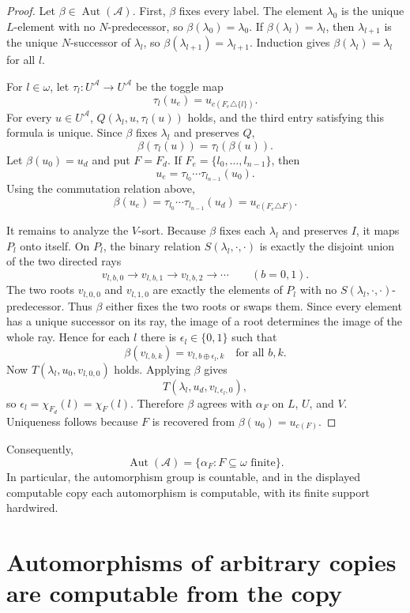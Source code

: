 \documentclass[12pt]{article}
\theoremstyle{definition}
\theoremstyle{remark}
\newcommand{\Aut}{\operatorname{Aut}}
\begin{document}
\begin{proof}
Let \(\beta\in\Aut(\mathcal A)\).  First, \(\beta\) fixes every label.  The element \(\lambda_0\) is the unique \(L\)-element with no \(N\)-predecessor, so \(\beta(\lambda_0)=\lambda_0\).  If \(\beta(\lambda_l)=\lambda_l\), then \(\lambda_{l+1}\) is the unique \(N\)-successor of \(\lambda_l\), so \(\beta(\lambda_{l+1})=\lambda_{l+1}\).  Induction gives \(\beta(\lambda_l)=\lambda_l\) for all \(l\).

For \(l\in\omega\), let \(\tau_l:U^{\mathcal A}\to U^{\mathcal A}\) be the toggle map
\[
\tau_l(u_e)=u_{c(F_e\triangle\{l\})}.
\]
For every \(u\in U^{\mathcal A}\), \(Q(\lambda_l,u,\tau_l(u))\) holds, and the third entry satisfying this formula is unique.  Since \(\beta\) fixes \(\lambda_l\) and preserves \(Q\),
\[
\beta(\tau_l(u))=\tau_l(\beta(u)).
\]
Let \(\beta(u_0)=u_d\) and put \(F=F_d\).  If \(F_e=\{l_0,\dots,l_{n-1}\}\), then
\[
u_e=\tau_{l_0}\cdots\tau_{l_{n-1}}(u_0).
\]
Using the commutation relation above,
\[
\beta(u_e)
=\tau_{l_0}\cdots\tau_{l_{n-1}}(u_d)
=u_{c(F_e\triangle F)}.
\]

It remains to analyze the \(V\)-sort.  Because \(\beta\) fixes each \(\lambda_l\) and preserves \(I\), it maps \(P_l\) onto itself.  On \(P_l\), the binary relation \(S(\lambda_l,\cdot,\cdot)\) is exactly the disjoint union of the two directed rays
\[
v_{l,b,0}\to v_{l,b,1}\to v_{l,b,2}\to\cdots
\qquad (b=0,1).
\]
The two roots \(v_{l,0,0}\) and \(v_{l,1,0}\) are exactly the elements of \(P_l\) with no \(S(\lambda_l,\cdot,\cdot)\)-predecessor.  Thus \(\beta\) either fixes the two roots or swaps them.  Since every element has a unique successor on its ray, the image of a root determines the image of the whole ray.  Hence for each \(l\) there is \(\epsilon_l\in\{0,1\}\) such that
\[
\beta(v_{l,b,k})=v_{l,b\oplus\epsilon_l,k}
\quad\text{for all }b,k.
\]
Now \(T(\lambda_l,u_0,v_{l,0,0})\) holds.  Applying \(\beta\) gives
\[
T(\lambda_l,u_d,v_{l,\epsilon_l,0}),
\]
so \(\epsilon_l=\chi_{F_d}(l)=\chi_F(l)\).  Therefore \(\beta\) agrees with \(\alpha_F\) on \(L\), \(U\), and \(V\).  Uniqueness follows because \(F\) is recovered from \(\beta(u_0)=u_{c(F)}\).
\end{proof}

Consequently,
\[
\Aut(\mathcal A)=\{\alpha_F:F\subseteq\omega\text{ finite}\}.
\]
In particular, the automorphism group is countable, and in the displayed computable copy each automorphism is computable, with its finite support hardwired.

\section{Automorphisms of arbitrary copies are computable from the copy}\label{sec:copies}
\end{document}
